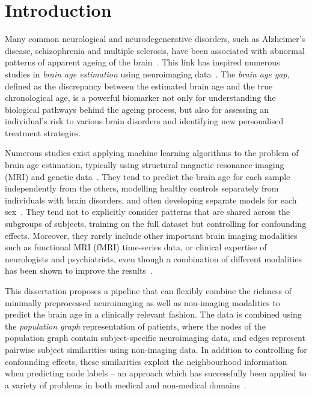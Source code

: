 \chapter{Introduction}



Many common neurological and neurodegenerative disorders, such as Alzheimer’s disease, schizophrenia and multiple sclerosis, have been associated with abnormal patterns of apparent ageing of the brain~\cite{kaufmann2019}. This link has inspired numerous studies in \textit{brain age estimation} using neuroimaging data~\cite{franke2019ten}. The \textit{brain age gap}, defined as the discrepancy between the estimated brain age and the true chronological age, is a powerful biomarker not only for understanding the biological pathways behind the ageing process, but also for assessing an individual’s risk to various brain disorders and identifying new personalised treatment strategies.


Numerous studies exist applying machine learning algorithms to the problem of brain age estimation, typically using structural magnetic resonance imaging (MRI) and genetic data~\cite{franke2019ten}. They tend to predict the brain age for each sample independently from the others, modelling healthy controls separately from individuals with brain disorders, and often developing separate models for each sex~\cite{kaufmann2019,niu2019improved}. They tend not to explicitly consider patterns that are shared across the subgroups of subjects, training on the full dataset but controlling for confounding effects. Moreover, they rarely include other important brain imaging modalities such as functional MRI (fMRI) time-series data, or clinical expertise of neurologists and psychiatrists, even though a combination of different modalities has been shown to improve the results~\cite{niu2019improved}. 


This dissertation proposes a pipeline that can flexibly combine the richness of minimally preprocessed neuroimaging as well as non-imaging modalities to predict the brain age in a clinically relevant fashion. The data is combined using the \textit{population graph} representation of patients, where the nodes of the population graph contain subject-specific neuroimaging data, and edges represent pairwise subject similarities using non-imaging data. In addition to controlling for confounding effects, these similarities exploit the neighbourhood information when predicting node labels – an approach which has successfully been applied to a variety of problems in both medical and non-medical domains~\cite{parisot2018disease}. 


